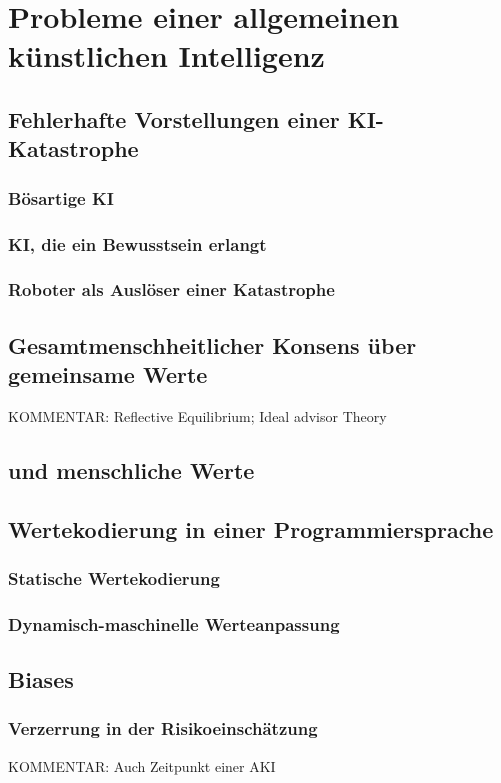 \chapter{Probleme einer allgemeinen künstlichen Intelligenz}
\section{Fehlerhafte Vorstellungen einer KI-Katastrophe}
\subsection{Bösartige KI}
\subsection{KI, die ein Bewusstsein erlangt}
\subsection{Roboter als Auslöser einer Katastrophe}
\section{Gesamtmenschheitlicher Konsens über gemeinsame Werte}
KOMMENTAR: Reflective Equilibrium; Ideal advisor Theory
\section{ und  menschliche Werte}
\section{Wertekodierung in einer Programmiersprache}
\subsection{Statische Wertekodierung}
\subsection{Dynamisch-maschinelle Werteanpassung}
\section{Biases}
\subsection{Verzerrung in der Risikoeinschätzung}
KOMMENTAR: Auch Zeitpunkt einer AKI
